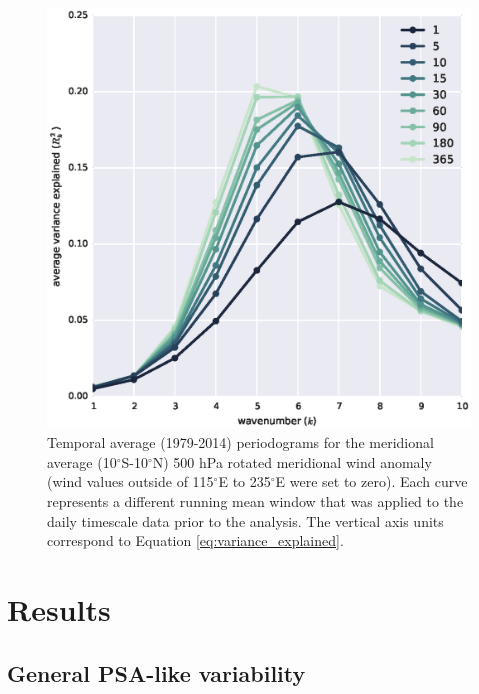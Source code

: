 \begin{figure}
\begin{center}
\includegraphics[width=0.7\columnwidth]{figures/psa/vrot-r2spectrum_ERAInterim_500hPa_daily-anom-wrt-all_native-np20N260E.eps}
\caption[Temporal average (1979-2014) periodograms for the meridional average (10$^{\circ}$S-10$^{\circ}$N) 500 hPa rotated meridional wind anomaly]{\label{fig:periodogram}
Temporal average (1979-2014) periodograms for the meridional average (10$^{\circ}$S-10$^{\circ}$N) 500 hPa rotated meridional wind anomaly (wind values outside of 115$^{\circ}$E to 235$^{\circ}$E were set to zero). Each curve represents a different running mean window that was applied to the daily timescale data prior to the analysis. The vertical axis units correspond to Equation \ref{eq:variance_explained}.%
}
\end{center}
\end{figure}



\section{Results}

\subsection{General PSA-like variability}

